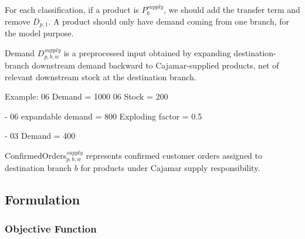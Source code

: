 \documentclass{article}
\begin{document}
For each classification, if a product is $P^{supply}_b$, we should add the transfer term and remove $D_{p,1}$. A product should only have demand coming from one branch, for the model purpose.

Demand $D^{supply}_{p,b,w}$ is a preprocessed input obtained by expanding destination-branch downstream demand backward to Cajamar-supplied products, net of relevant downstream stock at the destination branch.

Example: 
06 Demand = 1000
06 Stock = 200

- 06 expandable demand = 800
Exploding factor = 0.5

- 03 Demand = 400

ConfirmedOrders$^{supply}_{p,b,w}$ represents confirmed customer orders assigned to destination branch $b$ for products under Cajamar supply responsibility.

\subsection{Formulation}

\subsubsection{Objective Function}
\end{document}
